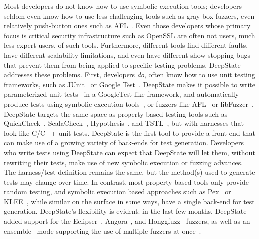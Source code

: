 Most developers do not know how to use symbolic execution tools; developers seldom even know how to use less challenging tools such as gray-box fuzzers, even relatively push-button ones such as AFL~\cite{aflfuzz}.  Even those developers whose primary focus is critical security infrastructure such as OpenSSL are often not users, much less expert users, of such tools.  Furthermore, different tools find different faults, have different scalability limitations, and even have different show-stopping bugs that prevent them from being applied to specific testing problems.  DeepState~\cite{DeepState} addresses these problems.  First, developers \emph{do}, often know how to use unit testing frameworks, such as JUnit~\cite{JUnit} or Google Test~\cite{GoogleTest}. DeepState makes it possible to write parameterized unit tests~\cite{ParamUnit} in a GoogleTest-like framework, and automatically produce tests using symbolic execution tools~\cite{angr1,angr2,angr3,Manticore}, or fuzzers like AFL~\cite{aflfuzz} or libFuzzer~\cite{libFuzzer}.  DeepState targets the same space as property-based testing tools such as QuickCheck~\cite{ClaessenH00}, ScalaCheck~\cite{ScalaCheckDoc}, Hypothesis~\cite{Hypothesis}, and TSTL~\cite{NFM15,tstlsttt}, but with harnesses that look like C/C++ unit tests. DeepState is the first tool to provide a front-end that can make use of a growing variety of back-ends for test generation.  Developers who write tests using DeepState can expect that DeepState will let them, without rewriting their tests, make use of new symbolic execution or fuzzing advances.  The harness/test definition remains the same, but the method(s) used to generate tests may change over time.  In contrast, most property-based tools only provide random testing, and symbolic execution based approaches such as Pex~\cite{Pex,UnitMeister} or KLEE~\cite{KLEE}, while similar on the surface in some ways, have a single back-end for test generation. DeepState's flexibility is evident: in the last few months, DeepState added support for the Eclipser~\cite{eclipser}, Angora~\cite{angora}, and Honggfuzz~\cite{Honggfuzz} fuzzers, as well as an ensemble~\cite{enfuzz} mode  supporting  the use  of multiple fuzzers at once~\cite{ensemble}.


